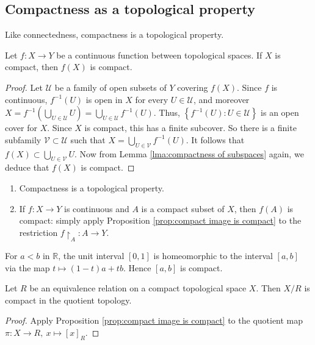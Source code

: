 \documentclass[a4paper]{article}
\begin{document}
\subsection{Compactness as a topological property}
Like connectedness, compactness is a topological property.
\begin{proposition}\label{prop:compact image is compact}
    Let $f: X \rightarrow Y$ be a continuous function between topological spaces. If $X$ is compact, then $f(X)$ is compact.
\end{proposition}
\begin{proof}
    Let $\mathcal{U}$ be a family of open subsets of $Y$ covering $f(X)$. Since $f$ is continuous, $f^{-1}(U)$ is open in $X$ for every $U \in \mathcal{U}$, and moreover
$X=f^{-1}\left(\bigcup_{U \in \mathcal{U}} U\right)=\bigcup_{U \in \mathcal{U}} f^{-1}(U)$. Thus, $\left\{f^{-1}(U): U \in \mathcal{U}\right\}$ is an open cover for $X$. Since $X$ is compact, this has a finite subcover. So there is a finite subfamily $\mathcal{V} \subset \mathcal{U}$ such that $X=\bigcup_{U \in \mathcal{V}} f^{-1}(U)$. It follows that $f(X) \subset \bigcup_{U \in \mathcal{V}} U$. Now from Lemma \ref{lma:compactness of subspaces} again, we deduce that $f(X)$ is compact.
\end{proof}
\begin{remark}
    \begin{enumerate}
        \item Compactness is a topological property.
      
        \item If $f: X \rightarrow Y$ is continuous and $A$ is a compact subset of $X$, then $f(A)$ is compact: simply apply Proposition \ref{prop:compact image is compact} to the restriction $f\restriction_{A}: A \rightarrow Y$.
      \end{enumerate}
\end{remark}

\begin{example}
    For $a<b$ in $\mathbb{R}$, the unit interval $[0,1]$ is homeomorphic to the interval $[a, b]$ via the map $t \mapsto(1-t) a+t b$. Hence $[a, b]$ is compact.
\end{example}

\begin{corollary}\label{col:compact quotient is compact}
    Let $R$ be an equivalence relation on a compact topological space $X$. Then $X / R$ is compact in the quotient topology.
\end{corollary}
\begin{proof}
    Apply Proposition \ref{prop:compact image is compact} to the quotient map $ \pi: X \to R,\ x \mapsto [x]_R $.
\end{proof}
\end{document}
